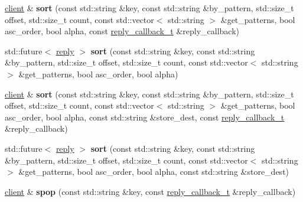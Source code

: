 \begin{DoxyCompactItemize}
\item 
\mbox{\label{classcpp__redis_1_1client_af962a79e0adec8e8e5e2e1d512be9a80}} 
\mbox{\hyperlink{classcpp__redis_1_1client}{client}} \& {\bfseries sort} (const std\+::string \&key, const std\+::string \&by\+\_\+pattern, std\+::size\+\_\+t offset, std\+::size\+\_\+t count, const std\+::vector$<$ std\+::string $>$ \&get\+\_\+patterns, bool asc\+\_\+order, bool alpha, const \mbox{\hyperlink{classcpp__redis_1_1client_af7a65eb21aa25230bfbb0b0203c4fc04}{reply\+\_\+callback\+\_\+t}} \&reply\+\_\+callback)
\item 
\mbox{\label{classcpp__redis_1_1client_afb923134bf1b936da3c01938db57af30}} 
std\+::future$<$ \mbox{\hyperlink{classcpp__redis_1_1reply}{reply}} $>$ {\bfseries sort} (const std\+::string \&key, const std\+::string \&by\+\_\+pattern, std\+::size\+\_\+t offset, std\+::size\+\_\+t count, const std\+::vector$<$ std\+::string $>$ \&get\+\_\+patterns, bool asc\+\_\+order, bool alpha)
\item 
\mbox{\label{classcpp__redis_1_1client_a251ad8183423ad67f830e68a558ec488}} 
\mbox{\hyperlink{classcpp__redis_1_1client}{client}} \& {\bfseries sort} (const std\+::string \&key, const std\+::string \&by\+\_\+pattern, std\+::size\+\_\+t offset, std\+::size\+\_\+t count, const std\+::vector$<$ std\+::string $>$ \&get\+\_\+patterns, bool asc\+\_\+order, bool alpha, const std\+::string \&store\+\_\+dest, const \mbox{\hyperlink{classcpp__redis_1_1client_af7a65eb21aa25230bfbb0b0203c4fc04}{reply\+\_\+callback\+\_\+t}} \&reply\+\_\+callback)
\item 
\mbox{\label{classcpp__redis_1_1client_aef109c8efe63525747ecb34994e6c318}} 
std\+::future$<$ \mbox{\hyperlink{classcpp__redis_1_1reply}{reply}} $>$ {\bfseries sort} (const std\+::string \&key, const std\+::string \&by\+\_\+pattern, std\+::size\+\_\+t offset, std\+::size\+\_\+t count, const std\+::vector$<$ std\+::string $>$ \&get\+\_\+patterns, bool asc\+\_\+order, bool alpha, const std\+::string \&store\+\_\+dest)
\item 
\mbox{\label{classcpp__redis_1_1client_a9a59ca9396d1447ae3a8bb584449e174}} 
\mbox{\hyperlink{classcpp__redis_1_1client}{client}} \& {\bfseries spop} (const std\+::string \&key, const \mbox{\hyperlink{classcpp__redis_1_1client_af7a65eb21aa25230bfbb0b0203c4fc04}{reply\+\_\+callback\+\_\+t}} \&reply\+\_\+callback)

\end{DoxyCompactItemize}
